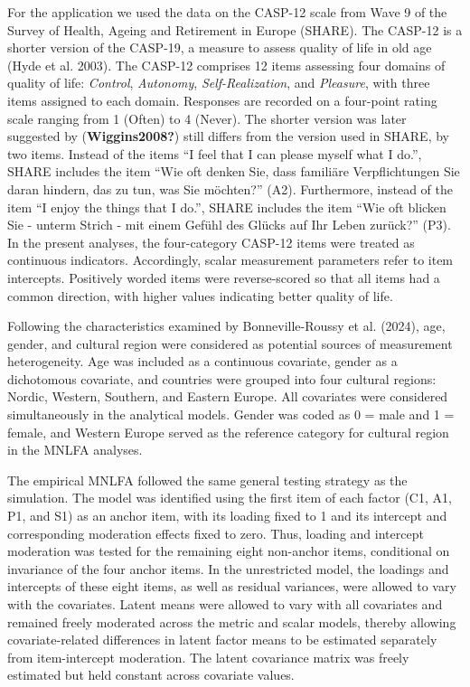 \documentclass[
  man,
  floatsintext]{apa7}
\begin{document}
For the application we used the data on the CASP-12 scale from Wave 9 of
the Survey of Health, Ageing and Retirement in Europe (SHARE). The
CASP-12 is a shorter version of the CASP-19, a measure to assess quality
of life in old age (Hyde et al. 2003). The CASP-12 comprises 12 items
assessing four domains of quality of life: \emph{Control},
\emph{Autonomy}, \emph{Self-Realization}, and \emph{Pleasure}, with
three items assigned to each domain. Responses are recorded on a
four-point rating scale ranging from 1 (Often) to 4 (Never). The shorter
version was later suggested by (\textbf{Wiggins2008?}) still differs
from the version used in SHARE, by two items. Instead of the items ``I
feel that I can please myself what I do.'', SHARE includes the item
``Wie oft denken Sie, dass familiäre Verpflichtungen Sie daran hindern,
das zu tun, was Sie möchten?'' (A2). Furthermore, instead of the item
``I enjoy the things that I do.'', SHARE includes the item ``Wie oft
blicken Sie - unterm Strich - mit einem Gefühl des Glücks auf Ihr Leben
zurück?'' (P3). In the present analyses, the four-category CASP-12 items
were treated as continuous indicators. Accordingly, scalar measurement
parameters refer to item intercepts. Positively worded items were
reverse-scored so that all items had a common direction, with higher
values indicating better quality of life.

Following the characteristics examined by Bonneville-Roussy et al.
(2024), age, gender, and cultural region were considered as potential
sources of measurement heterogeneity. Age was included as a continuous
covariate, gender as a dichotomous covariate, and countries were grouped
into four cultural regions: Nordic, Western, Southern, and Eastern
Europe. All covariates were considered simultaneously in the analytical
models. Gender was coded as 0 = male and 1 = female, and Western Europe
served as the reference category for cultural region in the MNLFA
analyses.

The empirical MNLFA followed the same general testing strategy as the
simulation. The model was identified using the first item of each factor
(C1, A1, P1, and S1) as an anchor item, with its loading fixed to 1 and
its intercept and corresponding moderation effects fixed to zero. Thus,
loading and intercept moderation was tested for the remaining eight
non-anchor items, conditional on invariance of the four anchor items. In
the unrestricted model, the loadings and intercepts of these eight
items, as well as residual variances, were allowed to vary with the
covariates. Latent means were allowed to vary with all covariates and
remained freely moderated across the metric and scalar models, thereby
allowing covariate-related differences in latent factor means to be
estimated separately from item-intercept moderation. The latent
covariance matrix was freely estimated but held constant across
covariate values.
\end{document}
